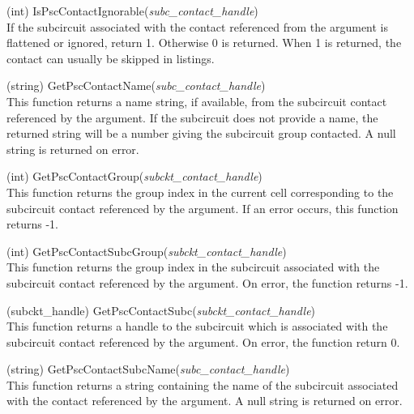 \begin{description}
\item{(int) \vt IsPscContactIgnorable({\it subc\_contact\_handle\/})}\\
If the subcircuit associated with the contact referenced from the
argument is flattened or ignored, return 1.  Otherwise 0 is returned. 
When 1 is returned, the contact can usually be skipped in listings.

\item{(string) \vt GetPscContactName({\it subc\_contact\_handle\/})}\\
This function returns a name string, if available, from the subcircuit
contact referenced by the argument.  If the subcircuit does not
provide a name, the returned string will be a number giving the
subcircuit group contacted.  A null string is returned on error.

\item{(int) \vt GetPscContactGroup({\it subckt\_contact\_handle})}\\
This function returns the group index in the current cell
corresponding to the subcircuit contact referenced by the argument. 
If an error occurs, this function returns -1.

\item{(int) \vt GetPscContactSubcGroup({\it subckt\_contact\_handle})}\\
This function returns the group index in the subcircuit associated
with the subcircuit contact referenced by the argument.  On error, the
function returns -1.

\item{(subckt\_handle) \vt GetPscContactSubc({\it subckt\_contact\_handle})}\\
This function returns a handle to the subcircuit which is associated
with the subcircuit contact referenced by the argument.  On error, the
function return 0.

\item{(string) \vt GetPscContactSubcName({\it subc\_contact\_handle\/})}\\
This function returns a string containing the name of the subcircuit
associated with the contact referenced by the argument.  A null string
is returned on error.


\end{description}
